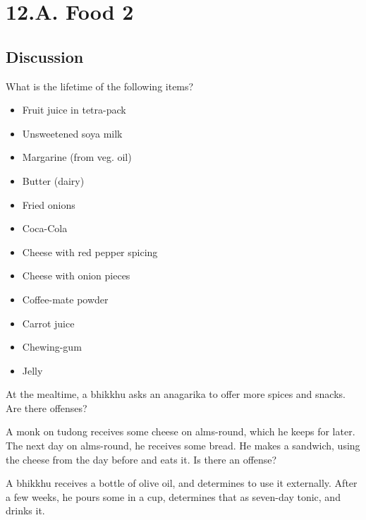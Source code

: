 \chapter{12.A. Food 2}
\renewcommand*{\theChapterTitle}{12.A. Food 2}

\section*{Discussion}

What is the lifetime of the following items?

\bigskip

\begin{multicols}{2}

\begin{itemize}

\item Fruit juice in tetra-pack
\item Unsweetened soya milk
\item Margarine (from veg. oil)
\item Butter (dairy)
\item Fried onions
\item Coca-Cola

\columnbreak

\item Cheese with red pepper spicing
\item Cheese with onion pieces
\item Coffee-mate powder
\item Carrot juice
\item Chewing-gum
\item Jelly

\end{itemize}

\end{multicols}

\bigskip

At the mealtime, a bhikkhu asks an anagarika to offer more spices and snacks.
Are there offenses?

\bigskip

A monk on tudong receives some cheese on alms-round, which he keeps for later.
The next day on alms-round, he receives some bread. He makes a sandwich, using
the cheese from the day before and eats it. Is there an offense?

\bigskip

A bhikkhu receives a bottle of olive oil, and determines to use it externally.
After a few weeks, he pours some in a cup, determines that as seven-day tonic,
and drinks it.

